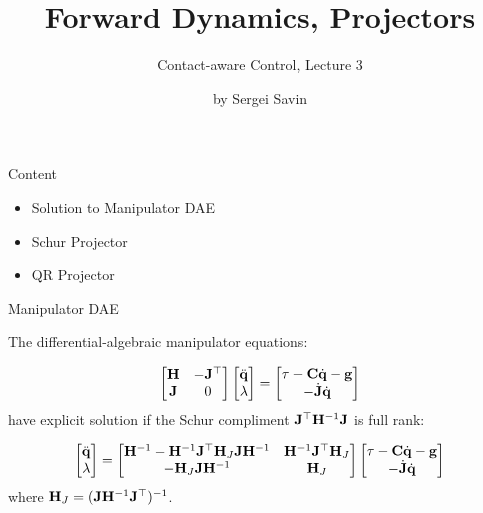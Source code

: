 \documentclass{beamer}
\title{Forward Dynamics, Projectors}
\subtitle{Contact-aware Control, Lecture 3}
\author{by Sergei Savin}
\date{\mydate}
\begin{document}
\maketitle


\begin{frame}{Content}

\begin{itemize}
\item Solution to Manipulator DAE
\item Schur Projector
\item QR Projector
\end{itemize}

\end{frame}




\begin{frame}{Manipulator DAE}
	\begin{flushleft}
		
		The differential-algebraic manipulator equations:
		
		\begin{equation}
			\begin{bmatrix}
				\mathbf{H} & -\mathbf{J}^\top \\
				\mathbf{J} & 0
			\end{bmatrix}
			\begin{bmatrix}
				\ddot{\mathbf{q}} \\
				\lambda
			\end{bmatrix}
			=
			\begin{bmatrix}
				\tau - \mathbf{C} \dot{\mathbf{q}} - \mathbf{g} \\
				-\dot{\mathbf{J}} \dot{\mathbf{q}}
			\end{bmatrix}
		\end{equation}
		have explicit solution if the Schur compliment $\mathbf{J}^\top \mathbf{H}^{-1}\mathbf{J}$ is full rank:
		
		\begin{equation}
			\begin{bmatrix}
				\ddot{\mathbf{q}} \\
				\lambda
			\end{bmatrix}
		=
		\begin{bmatrix}
			\mathbf{H}^{-1}-\mathbf{H}^{-1} \mathbf{J}^\top \mathbf{H}_J \mathbf{J} \mathbf{H}^{-1} &
			 \mathbf{H}^{-1} \mathbf{J}^\top \mathbf{H}_J \\
			-\mathbf{H}_J \mathbf{J} \mathbf{H}^{-1} & \mathbf{H}_J
		\end{bmatrix}
			\begin{bmatrix}
				\tau - \mathbf{C} \dot{\mathbf{q}} - \mathbf{g} \\
				-\dot{\mathbf{J}} \dot{\mathbf{q}}
			\end{bmatrix}
		\end{equation}
		where $\mathbf{H}_J = ( \mathbf{J} \mathbf{H}^{-1} \mathbf{J}^\top )^{-1}$.
				
	\end{flushleft}
\end{frame}
\end{document}
